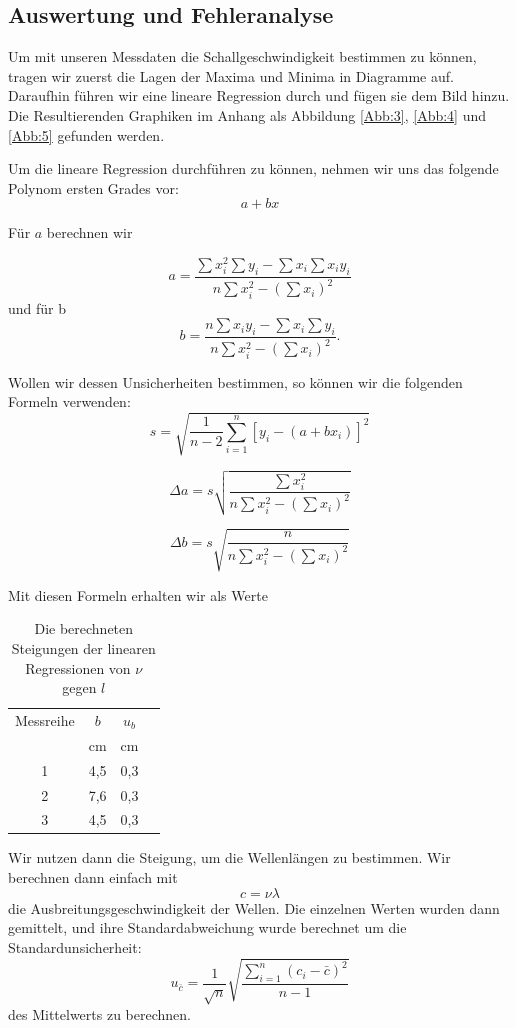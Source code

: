 \documentclass[11pt,a4paper]{article}
\begin{document}
\subsection{Auswertung und Fehleranalyse}

Um mit unseren Messdaten die Schallgeschwindigkeit bestimmen zu k\"onnen, tragen wir zuerst die Lagen der Maxima und Minima in Diagramme auf. Daraufhin f\"uhren wir eine lineare Regression durch und f\"ugen sie dem Bild hinzu. Die Resultierenden Graphiken im Anhang als Abbildung \ref{Abb:3}, \ref{Abb:4} und \ref{Abb:5} gefunden werden.

Um die lineare Regression durchf\"uhren zu k\"onnen, nehmen wir uns das folgende Polynom ersten Grades vor:
\[ a+bx\]

F\"ur $a$ berechnen wir

\[a=\frac{\sum x_i^2\sum y_i-\sum x_i\sum x_iy_i}{n\sum x_i^2-(\sum x_i)^2}\]
und f\"ur b
\[b=\frac{n\sum x_iy_i-\sum x_i\sum y_i}{n\sum x_i^2-(\sum x_i)^2}.\]

Wollen wir dessen Unsicherheiten bestimmen, so k\"onnen wir die folgenden Formeln verwenden:
\[
s=\sqrt{\frac{1}{n-2}\sum^n_{i=1}[y_i-(a+bx_i)]^2}\]

\[\Delta a=s\sqrt{\frac{\sum x_i^2}{n\sum x_i^2-(\sum x_i)^2}}\]

\[\Delta b=s\sqrt{\frac{n}{n\sum x_i^2-(\sum x_i)^2}}\]

Mit diesen Formeln erhalten wir als Werte

\begin{table}[h]
	\centering
	\begin{tabular*}{0.50\textwidth}{@{\extracolsep{\fill}}cccc}
		\toprule
		Messreihe & $b$ & $u_b$ \\
		& cm & cm\\
		1 & 4,5 & 0,3\\
		2 & 7,6 & 0,3\\
		3 & 4,5 & 0,3\\
		\bottomrule
	\end{tabular*}
\caption{Die berechneten Steigungen der linearen Regressionen von $\nu$ gegen $l$}
\label{Table1}
\end{table}

Wir nutzen dann die Steigung, um die Wellenl\"angen zu bestimmen. Wir berechnen dann einfach mit
\begin{equation}
c=\nu\lambda
\end{equation}
die Ausbreitungsgeschwindigkeit der Wellen.
Die einzelnen Werten wurden dann gemittelt, und ihre Standardabweichung wurde berechnet um die Standardunsicherheit:
$$u_{\bar{c}} = \frac{1}{\sqrt{n}} \sqrt{\frac{\sum_{i=1}^{n}(c_i-\bar{c})^2}{n-1}}$$
des Mittelwerts zu berechnen. 
 
\end{document}
